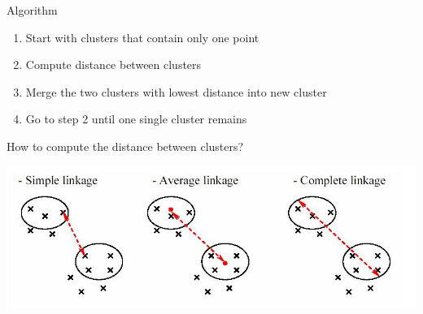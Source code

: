\documentclass{beamer}\usepackage[]{graphicx}\usepackage[]{color}
\begin{document}
\begin{frame}[fragile]{Algorithm}
  \begin{enumerate}
    \item Start with clusters that contain only one point
    \item Compute distance between clusters
    \item Merge the two clusters with lowest distance into new cluster
    \item Go to step 2 until one single cluster remains
  \end{enumerate}
\end{frame}

\begin{frame}[fragile]{How to compute the distance between clusters?}
  \begin{center}
    \includegraphics[width=\linewidth]{clust_linkage.jpg}
  \end{center}
\end{frame}
\end{document}
